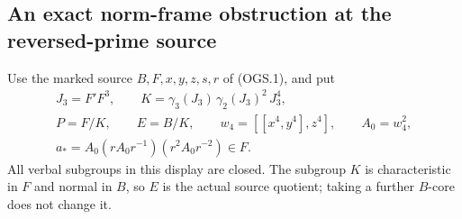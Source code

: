 \subsection{An exact norm-frame obstruction at the reversed-prime source}

Use the marked source $B,F,x,y,z,s,r$ of (OGS.1),
and put
\[
 \begin{gathered}
 J_3=F'F^3,\qquad
 K=\gamma_3(J_3)\,\gamma_2(J_3)^2\,J_3^4,\\
 P=F/K,\qquad E=B/K,\qquad
 w_4=[[x^4,y^4],z^4],\qquad A_0=w_4^2,\\
 a_*=A_0(rA_0r^{-1})(r^2A_0r^{-2})\in F.
 \end{gathered}                                                   \tag{RPO.1}
\]
All verbal subgroups in this display are closed.
The subgroup $K$ is characteristic in $F$ and
normal in $B$, so $E$ is the actual source quotient;
taking a further $B$-core does not change it.

